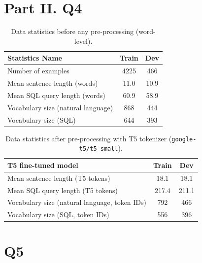 \documentclass{article}
\begin{document}
\section*{Part II. Q4}
%


\begin{table}[h!]
\centering
\begin{tabular}{lcc}
\toprule
Statistics Name & Train & Dev \\
\midrule
Number of examples & 4225 & 466 \\
Mean sentence length (words) & 11.0 & 10.9 \\
Mean SQL query length (words) & 60.9 & 58.9 \\
Vocabulary size (natural language) & 868 & 444 \\
Vocabulary size (SQL) & 644 & 393 \\
\bottomrule
\end{tabular}
\caption{Data statistics before any pre-processing (word-level).}
\label{tab:data_stats_before}
\end{table}

\begin{table}[h!]
\centering
\begin{tabular}{lcc}
\toprule
\textbf{T5 fine-tuned model} & Train & Dev \\
\midrule
Mean sentence length (T5 tokens) & 18.1 & 18.1 \\
Mean SQL query length (T5 tokens) & 217.4 & 211.1 \\
Vocabulary size (natural language, token IDs) & 792 & 466 \\
Vocabulary size (SQL, token IDs) & 556 & 396 \\
\bottomrule
\end{tabular}
\caption{Data statistics after pre-processing with T5 tokenizer (\texttt{google-t5/t5-small}).}
\label{tab:data_stats_after}
\end{table}



\newpage




\section*{Q5}\label{sec:t5}
\end{document}
